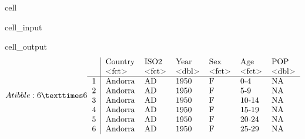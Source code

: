 \documentclass[letterpaper,10pt,english]{jupyterBook}
\begin{document}
\begin{sphinxuseclass}{cell}\begin{sphinxVerbatimInput}

\begin{sphinxuseclass}{cell_input}
\begin{sphinxVerbatim}[commandchars=\\\{\}]
\end{sphinxVerbatim}

\end{sphinxuseclass}\end{sphinxVerbatimInput}
\begin{sphinxVerbatimOutput}

\begin{sphinxuseclass}{cell_output}\begin{equation*}
\begin{split}A tibble: 6 × 6
\begin{tabular}{r|llllll}
  & Country & ISO2 & Year & Sex & Age & POP\\
  & <fct> & <fct> & <dbl> & <fct> & <fct> & <dbl>\\
\hline
	1 & Andorra & AD & 1950 & F & 0-4   & NA\\
	2 & Andorra & AD & 1950 & F & 5-9   & NA\\
	3 & Andorra & AD & 1950 & F & 10-14 & NA\\
	4 & Andorra & AD & 1950 & F & 15-19 & NA\\
	5 & Andorra & AD & 1950 & F & 20-24 & NA\\
	6 & Andorra & AD & 1950 & F & 25-29 & NA\\
\end{tabular}\end{split}
\end{equation*}
\end{sphinxuseclass}\end{sphinxVerbatimOutput}

\end{sphinxuseclass}
\end{document}
